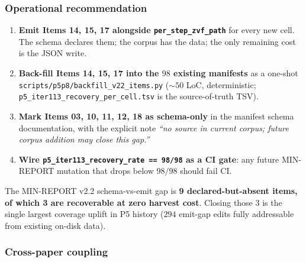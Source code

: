\documentclass{article}  \usepackage[preprint,nonatbib]{neurips_2026} \usepackage[numbers]{natbib}
\begin{document}
\subsubsection{Operational recommendation}

\begin{enumerate}
  \item \textbf{Emit Items 14, 15, 17 alongside \texttt{per\_step\_zvf\_path}}
        for every new cell. The schema declares them; the corpus has the
        data; the only remaining cost is the JSON write.
  \item \textbf{Back-fill Items 14, 15, 17 into the $98$ existing
        manifests} as a one-shot
        \texttt{scripts/p5p8/backfill\_v22\_items.py} ($\sim 50$ LoC,
        deterministic; \texttt{p5\_iter113\_recovery\_per\_cell.tsv} is
        the source-of-truth TSV).
  \item \textbf{Mark Items 03, 10, 11, 12, 18 as schema-only} in the
        manifest schema documentation, with the explicit note
        \emph{``no source in current corpus; future corpus addition may
        close this gap.''}
  \item \textbf{Wire \texttt{p5\_iter113\_recovery\_rate == 98/98} as a
        CI gate}: any future MIN-REPORT mutation that drops below
        $98/98$ should fail CI.
\end{enumerate}

The MIN-REPORT v2.2 schema-vs-emit gap is \textbf{9 declared-but-absent
items, of which 3 are recoverable at zero harvest cost}. Closing those
$3$ is the single largest coverage uplift in P5 history ($294$
emit-gap edits fully addressable from existing on-disk data).

\subsubsection{Cross-paper coupling}
\end{document}
